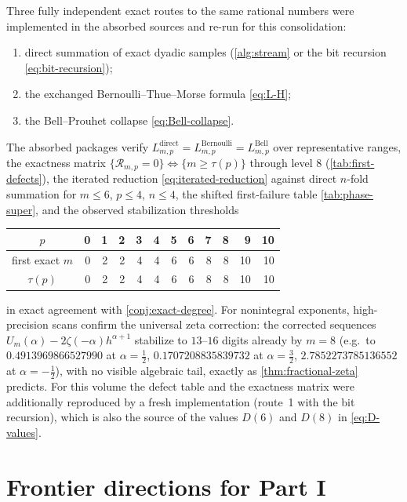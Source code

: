\documentclass[11pt,oneside]{article}
\numberwithin{equation}{section}
\theoremstyle{definition}
\theoremstyle{remark}
\newcommand{\defect}{\mathcal R}
\begin{document}
Three fully independent exact routes to the same rational numbers were
implemented in the absorbed sources and re-run for this
consolidation:
\begin{enumerate}
\item direct summation of exact dyadic samples
(\cref{alg:stream} or the bit recursion \eqref{eq:bit-recursion});
\item the exchanged Bernoulli--Thue--Morse formula \eqref{eq:L-H};
\item the Bell--Prouhet collapse \eqref{eq:Bell-collapse}.
\end{enumerate}
The absorbed packages verify
$L^{\mathrm{direct}}_{m,p}=L^{\mathrm{Bernoulli}}_{m,p}
=L^{\mathrm{Bell}}_{m,p}$ over representative ranges, the exactness
matrix $\{\defect_{m,p}=0\}\Leftrightarrow\{m\ge\tau(p)\}$ through
level $8$ (\cref{tab:first-defects}), the iterated reduction
\eqref{eq:iterated-reduction} against direct $n$-fold summation for
$m\le6$, $p\le4$, $n\le4$, the shifted first-failure table
\ref{tab:phase-super}, and the observed stabilization thresholds
\begin{center}
\small
\begin{tabular}{c|rrrrrrrrrrr}
\toprule
$p$ & 0&1&2&3&4&5&6&7&8&9&10\\
\midrule
first exact $m$ & 0&2&2&4&4&6&6&8&8&10&10\\
$\tau(p)$       & 0&2&2&4&4&6&6&8&8&10&10\\
\bottomrule
\end{tabular}
\end{center}
in exact agreement with \cref{conj:exact-degree}.  For nonintegral
exponents, high-precision scans confirm the universal zeta correction:
the corrected sequences $U_m(\alpha)-2\zeta(-\alpha)h^{\alpha+1}$
stabilize to $13$--$16$ digits already by $m=8$ (e.g.\ to
$0.4913969866527990$ at $\alpha=\tfrac12$, $0.1707208835839732$ at
$\alpha=\tfrac32$, $2.7852273785136552$ at $\alpha=-\tfrac12$), with
no visible algebraic tail, exactly as \cref{thm:fractional-zeta}
predicts.  For this volume the defect table and the exactness matrix
were additionally reproduced by a fresh implementation (route~1 with
the bit recursion), which is also the source of the values $D(6)$ and
$D(8)$ in \eqref{eq:D-values}.

\section{Frontier directions for Part I}
\label{sec:frontiers-sums}
\end{document}
